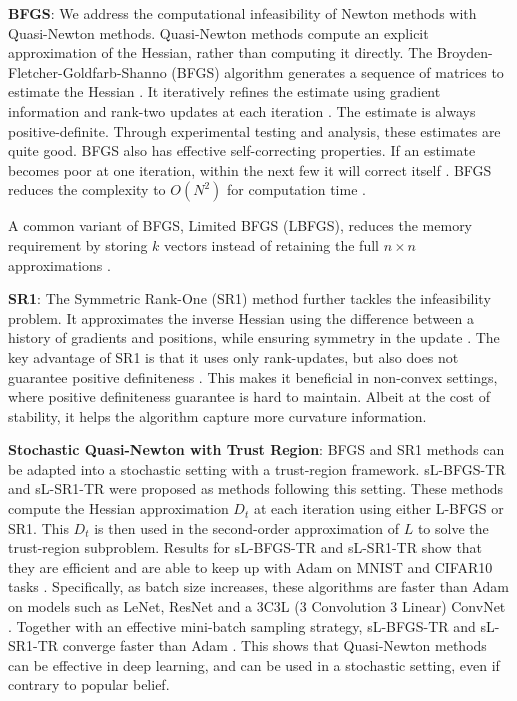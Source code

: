 \textbf{BFGS}: We address the computational infeasibility of Newton methods with Quasi-Newton methods. Quasi-Newton methods compute an explicit approximation of the Hessian, rather than computing it directly. The Broyden-Fletcher-Goldfarb-Shanno (BFGS) algorithm generates a sequence of matrices to estimate the Hessian \citep{NoceWrig06}. It iteratively refines the estimate using gradient information and rank-two updates at each iteration \citep{NoceWrig06}. The estimate is always positive-definite. Through experimental testing and analysis, these estimates are quite good. BFGS also has effective self-correcting properties. If an estimate becomes poor at one iteration, within the next few it will correct itself \citep{NoceWrig06}. BFGS reduces the complexity to $O(N^2)$ for computation time \citep{NoceWrig06, sun2019survey}.  

A common variant of BFGS, Limited BFGS (LBFGS), reduces the memory requirement by storing $k$ vectors instead of retaining the full $n\times n$ approximations \citep{NoceWrig06, sun2019survey}.

\textbf{SR1}: The Symmetric Rank-One (SR1) method further tackles the infeasibility problem. It approximates the inverse Hessian using the difference between a history of gradients and positions, while ensuring symmetry in the update \citep{NoceWrig06}. The key advantage of SR1 is that it uses only rank-updates, but also does not guarantee positive definiteness \citep{NoceWrig06}. This makes it beneficial in non-convex settings, where positive definiteness guarantee is hard to maintain. Albeit at the cost of stability, it helps the algorithm capture more curvature information.

\textbf{Stochastic Quasi-Newton with Trust Region}: BFGS and SR1 methods can be adapted into a stochastic setting with a trust-region framework. sL-BFGS-TR and sL-SR1-TR were proposed as methods following this setting. These methods compute the Hessian approximation $D_t$ at each iteration using either L-BFGS or SR1. This $D_t$ is then used in the second-order approximation of $L$ to solve the trust-region subproblem. Results for sL-BFGS-TR and sL-SR1-TR show that they are efficient and are able to keep up with Adam on MNIST and CIFAR10 tasks \citep{yousefi2023deep}. Specifically, as batch size increases, these algorithms are faster than Adam on models such as LeNet, ResNet and a 3C3L (3 Convolution 3 Linear) ConvNet \citep{yousefi2023deep}. Together with an effective mini-batch sampling strategy, sL-BFGS-TR and sL-SR1-TR converge faster than Adam \citep{yousefi2023deep}. This shows that Quasi-Newton methods can be effective in deep learning, and can be used in a stochastic setting, even if contrary to popular belief.

